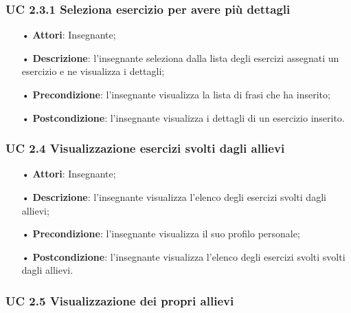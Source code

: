 \subsubsection{UC 2.3.1 Seleziona esercizio per avere più dettagli}
\begin{itemize}
	\item[•] \textbf{Attori}: Insegnante;
	\item[•] \textbf{Descrizione}: l’insegnante seleziona dalla lista degli esercizi assegnati un esercizio e ne visualizza i dettagli;
	\item[•] \textbf{Precondizione}: l'insegnante visualizza la lista di frasi che ha inserito;
	\item[•] \textbf{Postcondizione}: l’insegnante visualizza i dettagli di un esercizio inserito.
\end{itemize}



\subsubsection{UC 2.4 Visualizzazione esercizi svolti dagli allievi}
\begin{itemize}
	\item[•] \textbf{Attori}: Insegnante;
	\item[•] \textbf{Descrizione}:  l’insegnante visualizza l’elenco degli esercizi svolti dagli allievi;
	\item[•] \textbf{Precondizione}:  l’insegnante visualizza il suo profilo personale;

	\item[•] \textbf{Postcondizione}: l’insegnante visualizza l'elenco degli esercizi svolti svolti dagli allievi.
\end{itemize}

\subsubsection{UC 2.5 Visualizzazione dei propri allievi}


